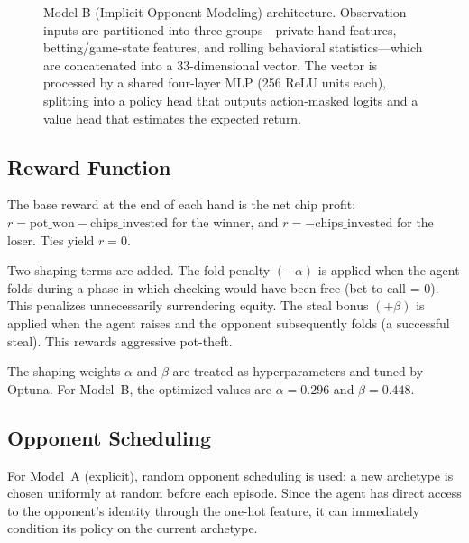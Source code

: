 \documentclass[conference]{IEEEtran}
\begin{document}
\begin{figure}[!t]
  \centering
  \caption{Model B (Implicit Opponent Modeling) architecture.
    Observation inputs are partitioned into three groups---private
    hand features, betting/game-state features, and rolling
    behavioral statistics---which are concatenated into a 33-dimensional
    vector. The vector is processed by a shared four-layer MLP
    (256 ReLU units each), splitting into a policy head that outputs
    action-masked logits and a value head that estimates the
    expected return.}
  \label{fig:architecture}
\end{figure}

\subsection{Reward Function}

The base reward at the end of each hand is the net chip profit:
$r = \text{pot\_won} - \text{chips\_invested}$ for the winner, and
$r = -\text{chips\_invested}$ for the loser. Ties yield $r=0$.

Two shaping terms \cite{ng1999policy} are added. The fold penalty $(-\alpha)$ is applied when the agent folds during a phase in which checking would have been free (bet-to-call = 0). This penalizes unnecessarily surrendering equity. The steal bonus $(+\beta)$ is applied when the agent raises and the opponent subsequently folds (a successful steal). This rewards aggressive pot-theft.

The shaping weights $\alpha$ and $\beta$ are treated as
hyperparameters and tuned by Optuna. For Model~B, the optimized
values are $\alpha = 0.296$ and $\beta = 0.448$.

\subsection{Opponent Scheduling}

For Model~A (explicit), random opponent scheduling is used:
a new archetype is chosen uniformly at random before each episode.
Since the agent has direct access to the opponent's identity through
the one-hot feature, it can immediately condition its policy on the
current archetype.
\end{document}
